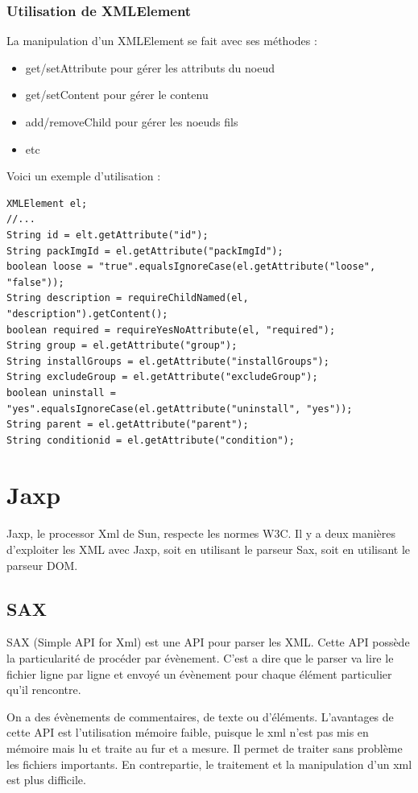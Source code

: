 \subsubsection{Utilisation de XMLElement}
La manipulation d'un XMLElement se fait avec ses méthodes :
\begin{itemize}
	\item get/setAttribute pour gérer les attributs du noeud
	\item get/setContent pour gérer le contenu
	\item add/removeChild pour gérer les noeuds fils
	\item etc
\end{itemize}

Voici un exemple d'utilisation :
\begin{lstlisting}
XMLElement el;
//...
String id = elt.getAttribute("id");
String packImgId = el.getAttribute("packImgId");
boolean loose = "true".equalsIgnoreCase(el.getAttribute("loose", "false"));
String description = requireChildNamed(el, "description").getContent();
boolean required = requireYesNoAttribute(el, "required");
String group = el.getAttribute("group");
String installGroups = el.getAttribute("installGroups");
String excludeGroup = el.getAttribute("excludeGroup");
boolean uninstall = "yes".equalsIgnoreCase(el.getAttribute("uninstall", "yes"));
String parent = el.getAttribute("parent");
String conditionid = el.getAttribute("condition");
\end{lstlisting}
\section{Jaxp}
Jaxp, le processor Xml de Sun, respecte les normes W3C. Il y a deux manières d'exploiter les XML avec Jaxp, soit en utilisant le parseur Sax, soit en utilisant le parseur DOM.
\subsection{SAX}
SAX (Simple API for Xml) est une API pour parser les XML. Cette API possède la particularité de procéder par évènement. C'est a dire que le parser va lire le fichier ligne par ligne et envoyé un évènement pour chaque élément particulier qu'il rencontre. 

On a des évènements de commentaires, de texte ou d'éléments. L'avantages de cette API est l'utilisation mémoire faible, puisque le xml n'est pas mis en mémoire mais lu et traite au fur et a mesure. Il permet de traiter sans problème les fichiers importants. En contrepartie, le traitement et la manipulation d'un xml est plus difficile.
